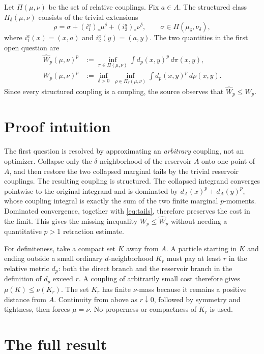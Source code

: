 \documentclass[11pt]{article}
\newcommand{\PiD}{\Pi_{\delta}}
\newcommand{\dd}{\,d}
\begin{document}
Let $\Pi(\mu,\nu)$ be the set of relative couplings.  Fix $a\in A$.
The structured class $\PiD(\mu,\nu)$ consists of the trivial extensions
\[
 \rho=\sigma+(i_1^a)_*\mu^\delta+(i_2^a)_*\nu^\delta,
 \qquad \sigma\in\Pi(\mu_\delta,\nu_\delta),
\]
where $i_1^a(x)=(x,a)$ and $i_2^a(y)=(a,y)$.  The two quantities in the
first open question are
\begin{align*}
 \widehat W_p(\mu,\nu)^p
   &:=\inf_{\pi\in\Pi(\mu,\nu)}\int d_p(x,y)^p\dd\pi(x,y),\\
 W_p(\mu,\nu)^p
   &:=\inf_{\delta>0}\ \inf_{\rho\in\PiD(\mu,\nu)}
       \int d_p(x,y)^p\dd\rho(x,y).
\end{align*}
Since every structured coupling is a coupling, the source observes that
$\widehat W_p\leq W_p$.

\section{Proof intuition}

The first question is resolved by approximating an \emph{arbitrary} coupling,
not an optimizer.  Collapse only the $\delta$-neighborhood of the reservoir
$A$ onto one point of $A$, and then restore the two collapsed marginal tails
by the trivial reservoir couplings.  The resulting coupling is structured.
The collapsed integrand converges pointwise to the original integrand and is
dominated by
$d_A(x)^p+d_A(y)^p$, whose coupling integral is exactly the sum of the two
finite marginal $p$-moments.  Dominated convergence, together with
\eqref{eq:tails},
therefore preserves the cost in the limit.  This gives the missing inequality
$W_p\leq\widehat W_p$ without needing a quantitative $p>1$ retraction
estimate.

For definiteness, take a compact set $K$ away from $A$.  A particle starting
in $K$ and ending outside a small ordinary $d$-neighborhood $K_r$ must pay at
least $r$ in the relative metric $d_p$: both the direct branch and the
reservoir branch in the definition of $d_p$ exceed $r$.  A coupling of
arbitrarily small cost therefore gives $\mu(K)\leq\nu(K_r)$.  The set $K_r$
has finite $\nu$-mass because it remains a positive distance from $A$.
Continuity from above as $r\downarrow0$, followed by symmetry and tightness,
then forces $\mu=\nu$.  No properness or compactness of $K_r$ is used.

\section{The full result}
\end{document}
